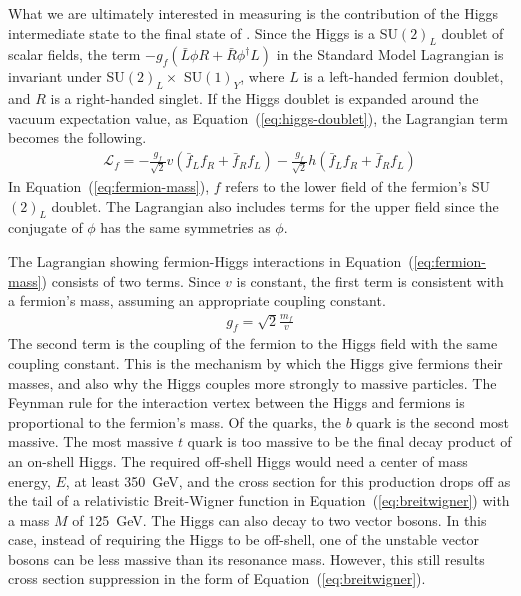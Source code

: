 What we are ultimately interested in measuring is the contribution of the
Higgs intermediate state to the final state of \bb.
Since the Higgs is a SU$(2)_L$ doublet of scalar fields,
the term $-g_f(\bar{L}\phi R + \bar{R} \phi^\dagger L)$ in the
Standard Model Lagrangian is invariant under SU$(2)_L \times$ SU$(1)_Y$,
where $L$ is a left-handed fermion doublet, and $R$ is a right-handed singlet.
If the Higgs doublet is expanded around the vacuum expectation value,
as Equation~(\ref{eq:higgs-doublet}), the Lagrangian term becomes the following.
\begin{gather}
  \mathcal{L}_f =
  -\frac{g_f}{\sqrt2} v \left(\bar{f}_L f_R + \bar{f}_R f_L \right)
  -\frac{g_f}{\sqrt2} h \left(\bar{f}_L f_R + \bar{f}_R f_L \right)
  \label{eq:fermion-mass}
\end{gather}
In Equation~(\ref{eq:fermion-mass}),
$f$ refers to the lower field of the fermion's SU$(2)_L$ doublet.
The Lagrangian also includes terms for the upper field since the conjugate of $\phi$
has the same symmetries as $\phi$. 

The Lagrangian showing fermion-Higgs interactions in
Equation~(\ref{eq:fermion-mass}) consists of two terms.
Since $v$ is constant, the first term is consistent with a fermion's mass,
assuming an appropriate coupling constant.
\begin{gather}
  g_f = \sqrt2 \frac{m_f}{v}
\end{gather}
The second term is the coupling of the fermion to the Higgs field
with the same coupling constant.
This is the mechanism by which the Higgs give fermions their masses,
and also why the Higgs couples more strongly to massive particles.
The Feynman rule for the interaction vertex between the Higgs and fermions
is proportional to the fermion's mass.
Of the quarks, the $b$ quark is the second most massive.
The most massive $t$ quark is too massive to be the final decay product of an on-shell Higgs.
The required off-shell Higgs would need a center of mass energy, $E$, at least \SI{350}{GeV},
and the cross section for this production drops off as the tail of a relativistic Breit-Wigner function
in Equation~(\ref{eq:breitwigner}) with a mass $M$ of \SI{125}{GeV}.
The Higgs can also decay to two vector bosons.
In this case, instead of requiring the Higgs to be off-shell,
one of the unstable vector bosons can be less massive than its resonance mass.
However, this still results cross section suppression in the form of Equation~(\ref{eq:breitwigner}).


